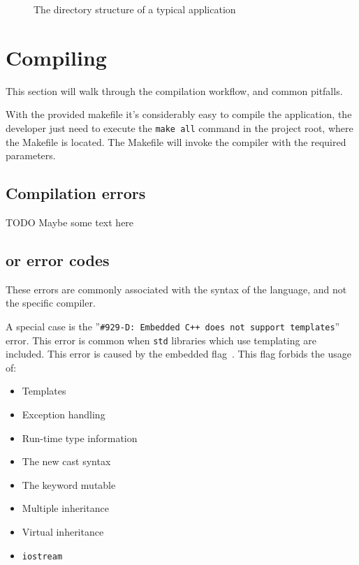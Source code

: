 \begin{figure}[!h]
	\centering
	\caption{The directory structure of a typical \pru{} application}
\label{fig:pru_dir_structure}
\end{figure}

\section{Compiling}

This section will walk through the compilation workflow, and common pitfalls.

With the provided makefile it's considerably easy to compile the application, the developer just need to execute the \verb|make all| command in the project root, where the Makefile is located. The Makefile will invoke the compiler with the required parameters.

\subsection{Compilation errors}

TODO Maybe some text here

\subsection{\cpl{} or \cpp{} error codes}

These errors are commonly associated with the syntax of the language, and not the specific compiler.

A special case is the ''\verb|#929-D: Embedded C++ does not support templates|'' error. This error is common when \verb+std+ libraries which use templating are included. This error is caused by the embedded \cpp{} flag~\cite[Section 5.13.4]{PRU_C_CPP}. This flag forbids the usage of:
\begin{itemize}
	\item Templates
	\item Exception handling
	\item Run-time type information
	\item The new cast syntax
	\item The keyword mutable
	\item Multiple inheritance
	\item Virtual inheritance
	\item \verb|iostream|
\end{itemize}

